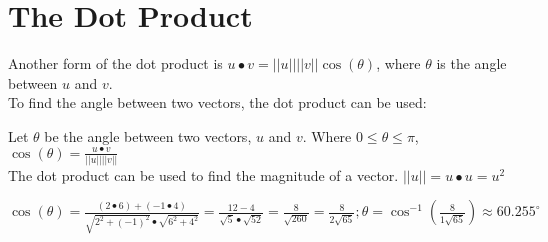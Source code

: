 \documentclass{report}
\begin{document}
\section{The Dot Product}


Another form of the dot product is $u \bullet v=||u||||v||\cos(\theta)$, where $\theta$ is the angle between $u$ and $v$.\\

To find the angle between two vectors, the dot product can be used:

Let $\theta$ be the angle between two vectors, $u$ and $v$. Where $0\le\theta\le\pi$, $\cos(\theta)=\frac{u \bullet v}{||u||||v||}$\\

The dot product can be used to find the magnitude of a vector. $||u||=u \bullet u=u^2$



\sol $\cos(\theta)=\frac{(2 \bullet 6)+(-1 \bullet 4)}{\sqrt{2^2+(-1)^2}\bullet\sqrt{6^2+4^2}}=\frac{12-4}{\sqrt{5}\bullet\sqrt{52}}=\frac{8}{\sqrt{260}}=\frac{8}{2\sqrt{65}};\theta=\cos^{-1}(\frac{8}{1\sqrt{65}})\approx \boxed{60.255^\circ}$
\end{document}
